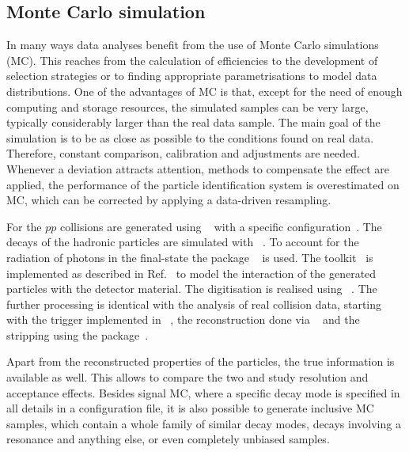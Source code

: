 
\subsection{Monte Carlo simulation}
\label{sec:detector:software:simulation}

In many ways data analyses benefit from the use of Monte Carlo simulations
(MC). This reaches from the calculation of efficiencies to the development of
selection strategies or to finding appropriate parametrisations to model data
distributions. One of the advantages of MC is that, except for the need of
enough computing and storage resources, the simulated samples can be very
large, typically considerably larger than the real data sample. The main goal
of the simulation is to be as close as possible to the conditions found on
real data. Therefore, constant comparison, calibration and adjustments are
needed. Whenever a deviation attracts attention, methods to compensate the
effect are applied, \eg the performance of the particle identification system
is overestimated on MC, which can be corrected by applying a data-driven
resampling.

For \lhcb the $pp$ collisions are generated using
\pythia~\cite{Sjostrand:2006za,*Sjostrand:2007gs} with a specific
configuration~\cite{LHCb-PROC-2010-056}. The decays of the hadronic particles
are simulated with \evtgen~\cite{Lange:2001uf}. To account for the radiation
of photons in the final-state the package
\photos~\cite{Golonka:2005pn} is used. The \geant
toolkit~\cite{Allison:2006ve, *Agostinelli:2002hh} is implemented as described
in Ref.~\cite{LHCb-PROC-2011-006} to model the interaction of the generated
particles with the detector material. The digitisation is realised using
\boole~\cite{Boole}. The further processing is identical with the analysis of real
collision data, starting with the trigger implemented in \moore~\cite{Moore},
the reconstruction done via \brunel~\cite{Brunel} and the stripping using the
\davinci package~\cite{DaVinci}.

Apart from the reconstructed properties of the particles, the true information
is available as well. This allows to compare the two and study resolution and
acceptance effects. Besides signal MC, where a specific decay mode is
specified in all details in a configuration file, it is also possible to
generate inclusive MC samples, which contain a whole family of similar decay
modes, \eg decays involving a \jpsi resonance and anything else, or even
completely unbiased samples.
